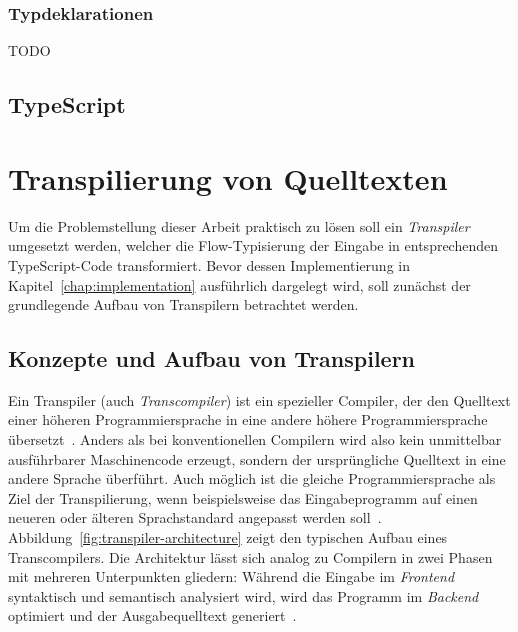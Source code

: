 \subsubsection{Typdeklarationen}
\label{subsubsec:type-declarations}

TODO

\bigbreak


\subsection{TypeScript}

\section{Transpilierung von Quelltexten}
\label{sec:transpilers}

Um die Problemstellung dieser Arbeit praktisch zu lösen soll ein \textit{Transpiler} umgesetzt werden, welcher die Flow-Typisierung der Eingabe in entsprechenden TypeScript-Code transformiert. Bevor dessen Implementierung in Kapitel~\ref{chap:implementation} ausführlich dargelegt wird, soll zunächst der grundlegende Aufbau von Transpilern betrachtet werden.

\subsection{Konzepte und Aufbau von Transpilern}

Ein Transpiler (auch \textit{Transcompiler}) ist ein spezieller Compiler, der den Quelltext einer höheren Programmiersprache in eine andere höhere Programmiersprache übersetzt~\autocite[3]{AHO:COMPILERS}. Anders als bei konventionellen Compilern wird also kein unmittelbar ausführbarer Maschinencode erzeugt, sondern der ursprüngliche Quelltext in eine andere Sprache überführt. Auch möglich ist die gleiche Programmiersprache als Ziel der Transpilierung, wenn beispielsweise das Eingabeprogramm auf einen neueren oder älteren Sprachstandard angepasst werden soll~\autocite{EVGENIY:2016}.
Abbildung~\ref{fig:transpiler-architecture} zeigt den typischen Aufbau eines Transcompilers. Die Architektur lässt sich analog zu Compilern in zwei Phasen mit mehreren Unterpunkten gliedern: Während die Eingabe im \emph{Frontend} syntaktisch und semantisch analysiert wird, wird das Programm im \emph{Backend} optimiert und der Ausgabequelltext generiert~\autocite[136]{APPEL:2003}.

